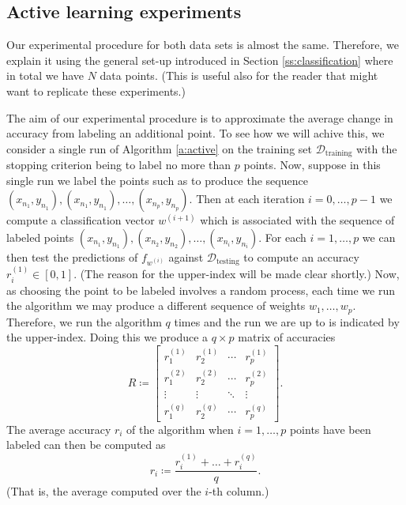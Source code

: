 \documentclass[11pt]{amsart}
\theoremstyle{definition}
\theoremstyle{remark}
\begin{document}
    \subsection{Active learning experiments} 
        Our experimental procedure for both data sets is almost the same. Therefore, we explain it using the general set-up introduced in Section \ref{ss:classification} where in total we have $N$ data points. (This is useful also for the reader that might want to replicate these experiments.) 

        The aim of our experimental procedure is to approximate the average change in accuracy from labeling an additional point. To see how we will achive this, we consider a single run of Algorithm \ref{a:active} on the training set $\mathcal{D}_\text{training}$ with the stopping criterion being to label no more than $p$ points. Now, suppose in this single run we label the points such as to produce the sequence $(x_{n_1}, y_{n_1}), (x_{n_1}, y_{n_1}), \dots, (x_{n_{p}}, y_{n_{p}})$. Then at each iteration $i = 0, \dots, p - 1$ we compute a classification vector $w^{(i + 1)}$ which is associated with the sequence of labeled points $(x_{n_1}, y_{n_1}), (x_{n_2}, y_{n_2}), \dots, (x_{n_{i}}, y_{n_{i}})$. For each $i = 1, \dots, p$ we can then test the predictions of $f_{w^{(i)}}$ against $\mathcal{D}_\text{testing}$ to compute an accuracy $r^{(1)}_i \in [0, 1]$. (The reason for the upper-index will be made clear shortly.) Now, as choosing the point to be labeled involves a random process, each time we run the algorithm we may produce a different sequence of weights $w_1, \dots, w_p$. Therefore, we run the algorithm $q$ times and the run we are up to is indicated by the upper-index. Doing this we produce a $q \times p$ matrix of accuracies
        \begin{equation*}
            R \coloneqq \begin{bmatrix}
            r_1^{(1)} &  r_2^{(1)}  & \cdots & r_p^{(1)}\\
            r_1^{(2)}  &  r_2^{(2)} & \cdots & r_p^{(2)}\\
            \vdots & \vdots & \ddots & \vdots\\
            r_1^{(q)}  &  r_2^{(q)}  & \cdots & r_p^{(q)}
            \end{bmatrix}.
        \end{equation*}
        The average accuracy $r_i$ of the algorithm when $i = 1, \dots, p$ points have been labeled can then be computed as
        \begin{equation*}
            r_i \coloneqq \frac{r_i^{(1)} + \dots + r_i^{(q)}}{q}.
        \end{equation*}
        (That is, the average computed over the $i$-th column.)
\end{document}
